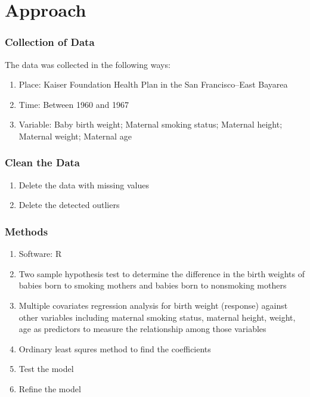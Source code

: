 \documentclass[compress,handout,10pt]{beamer}
\let\olditem\item
\renewcommand{\item}{\setlength{\itemsep}{0.5\baselineskip}\olditem}
\begin{document}
\section{Approach}
\begin{frame}
    \frametitle{Collection of Data}
    The data was collected in the following ways:
     \begin{enumerate}
         \item Place: Kaiser Foundation Health Plan in the San Francisco–East Bayarea
         \item Time: Between 1960 and 1967
         \item Variable: Baby birth weight; Maternal smoking status; Maternal height; Maternal weight; Maternal age
     \end{enumerate}
\end{frame}

\begin{frame}
    \frametitle{Clean the Data}
     \begin{enumerate}
     
         \item Delete the data with missing values
         \item Delete the detected outliers
    
     \end{enumerate}
\end{frame}

\begin{frame}
    \frametitle{Methods}
     \begin{enumerate}
         \item Software: R
         \item Two sample hypothesis test to determine the difference in the birth weights of babies born to smoking mothers and babies born to nonsmoking mothers
         \item Multiple covariates regression analysis for birth weight (response) against other variables including maternal smoking status, maternal height, weight, age as predictors to measure the relationship among those variables
         \item Ordinary least squres method to find the coefficients
         \item Test the model
         \item Refine the model
     \end{enumerate}
\end{frame}
\end{document}
